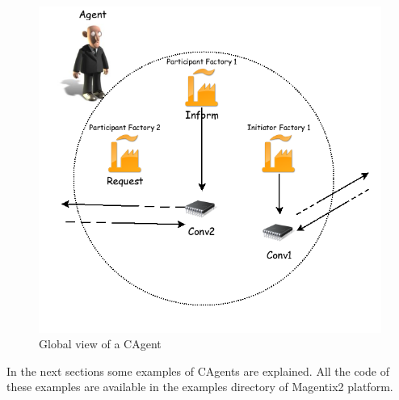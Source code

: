 \begin{figure}
\centering
\includegraphics[scale=0.37]{ProgrammingAgents/images/global}
\caption{Global view of a CAgent}
\label{img:global}
\end{figure}

In the next sections some examples of CAgents are explained. All the code of these examples are available in the examples directory of Magentix2 platform.

